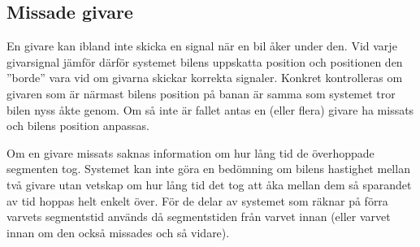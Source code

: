 \subsection{Missade givare}
\label{sec:missade givare}

En givare kan ibland inte skicka en signal när en bil åker under den. Vid varje
givarsignal jämför därför systemet bilens uppskatta position och positionen den
''borde'' vara vid om givarna skickar korrekta signaler. Konkret kontrolleras om
givaren som är närmast bilens position på banan är samma som systemet tror bilen
nyss åkte genom. Om så inte är fallet antas en (eller flera) givare ha missats
och bilens position anpassas.

Om en givare missats saknas information om hur lång tid de överhoppade segmenten
tog. Systemet kan inte göra en bedömning om bilens hastighet mellan två givare
utan vetskap om hur lång tid det tog att åka mellan dem så sparandet av tid
hoppas helt enkelt över. För de delar av systemet som räknar på förra varvets
segmentstid används då segmentstiden från varvet innan (eller varvet innan om
den också missades och så vidare).

